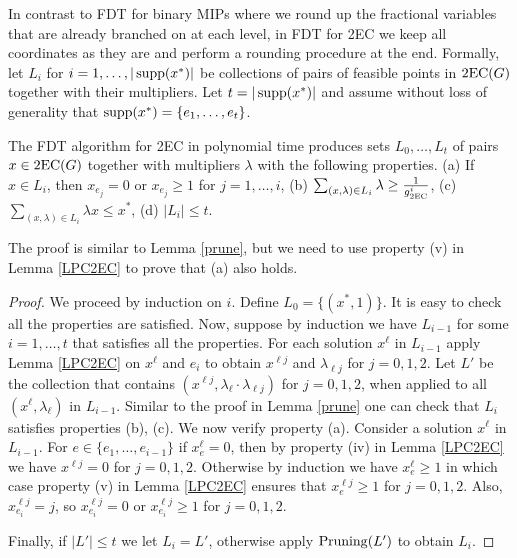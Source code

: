 In contrast to FDT for binary MIPs where we round up the fractional variables that are already branched on at each level, in FDT for 2EC we keep all coordinates as they are and perform a rounding procedure at the end. Formally, let $L_i$ for $i=1,\ldots,|\operatorname{supp}(x^*)|$ be collections of pairs of feasible points in $\operatorname{2EC}(G)$ together with their multipliers. Let $t=|\operatorname{supp}(x^*)|$ and assume without loss of generality that $\operatorname{supp}(x^*)=\{e_1,\ldots,e_t\}$. 

\begin{lemma}\label{2ecpruning}
	The FDT algorithm for 2EC in  polynomial time produces sets $L_0,\ldots,L_t$ of pairs $x\in \operatorname{2EC}(G)$ together with multipliers $\lambda$ with the following properties.
		(a) If $x\in L_i$, then $x_{e_j}=0$ or $x_{e_j}\geq 1$ for $j=1,\ldots,i$, (b) $\sum_{(x,\lambda)\in L_i }\lambda \geq \frac{1}{g_{\operatorname{2EC}}^i}$, (c) $\sum_{(x,\lambda)\in L_i }\lambda x \leq x^*$, (d) $|L_i|\leq t$.
\end{lemma}
The proof is similar to Lemma \ref{prune}, but we need to use property (v) in Lemma \ref{LPC2EC} to prove that (a) also holds.
\begin{proof}
	We proceed by induction on $i$. Define $L_0=\{(x^*,1)\}$. It is easy to check all the properties are satisfied. Now, suppose by induction we have $L_{i-1}$ for some $i=1,\ldots,t$ that satisfies all the properties. For each solution $x^\ell$ in $L_{i-1}$ apply Lemma \ref{LPC2EC} on $x^\ell$ and $e_{i}$ to obtain $x^{\ell j}$ and $\lambda_{\ell j}$ for $j=0,1,2$. Let $L'$ be the collection that contains $(x^{\ell j},\lambda_\ell \cdot \lambda_{\ell j})$ for $j=0,1,2$, when applied to all $(x^\ell,\lambda_\ell)$ in $L_{i-1}$. Similar to the proof in Lemma \ref{prune} one can check that $L_i$ satisfies properties (b), (c). We now verify property (a). Consider a solution $x^\ell$ in $L_{i-1}$. For $e\in \{e_1,\ldots,e_{i-1}\}$ if $x^\ell_e =0$, then by property (iv) in Lemma \ref{LPC2EC} we have $x^{\ell j}=0$ for $j=0,1,2$. Otherwise by induction we have $x^{\ell}_{e}\geq 1$ in which case property (v) in Lemma \ref{LPC2EC} ensures that $x^{\ell j}_e\geq 1$ for $j=0,1,2$. Also, $x^{\ell j}_{e_i}= j$, so $x^{\ell j}_{e_i}=0$ or $x^{\ell j}_{e_i}\geq 1$ for $j=0,1,2$. 
	
	Finally, if $|L'|\leq t$ we let $L_i=L'$, otherwise apply $\operatorname{Pruning}(L')$ to obtain $L_{i}$.
\end{proof}

